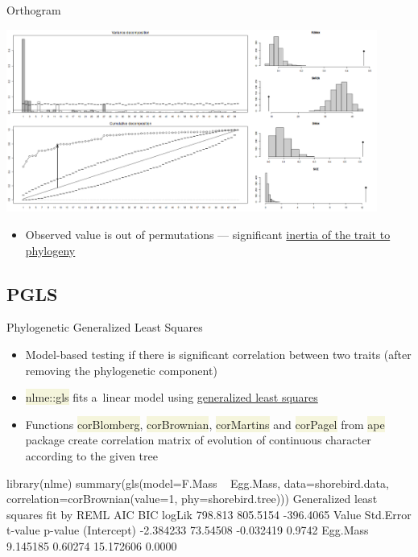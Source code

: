 \documentclass[compress, ucs, xelatex, 11pt, xcolor=svgnames, aspectratio=169,
	hyperref={
		bookmarks=true,
		unicode=true,
		colorlinks=true,
		pdftitle={Molecular data in R},
		plainpages=false,
		pdfauthor={Vojtech Zeisek},
		pdfsubject={Course about phylogeny and evolution in R},
		pdfcreator={XeLaTeX},
		pdfkeywords={R, evolution, phylogeny, molecular data},
		linkcolor=Crimson, %
		anchorcolor=Magenta, %
		citecolor=Magenta, %
		filecolor=Magenta, %
		menucolor=Magenta, %
		urlcolor=DodgerBlue, %
		pdftex},
	url={hyphens, lowtilde} %
	]{beamer}
\renewcommand{\texttt}[1]{\colorbox{Beige}{{\ttfamily #1}}}
\begin{document}
\begin{frame}{Orthogram}
	\begin{center}
		\includegraphics[height=6cm]{orthogram.png}
	\end{center}
	\begin{itemize}
		\item Observed value is out of permutations --- significant \href{https://en.wikipedia.org/wiki/Phylogenetic_inertia}{inertia of the trait to phylogeny}
	\end{itemize}
\end{frame}

\subsection{PGLS}

\begin{frame}[fragile]{Phylogenetic Generalized Least Squares}
	\begin{itemize}
		\item Model-based testing if there is significant correlation between two traits (after removing the phylogenetic component)
		\item \texttt{nlme::gls} fits a~linear model using \href{https://en.wikipedia.org/wiki/Generalized_least_squares}{generalized least squares}
		\item Functions \texttt{corBlomberg}, \texttt{corBrownian}, \texttt{corMartins} and \texttt{corPagel} from \texttt{ape} package create correlation matrix of evolution of continuous character according to the given tree
	\end{itemize}
	\begin{spluscode}
    library(nlme)
    summary(gls(model=F.Mass ~ Egg.Mass, data=shorebird.data,
      correlation=corBrownian(value=1, phy=shorebird.tree)))
      Generalized least squares fit by REML
          AIC      BIC    logLik
      798.813 805.5154 -396.4065
                    Value Std.Error   t-value p-value
    (Intercept) -2.384233  73.54508 -0.032419  0.9742
    Egg.Mass     9.145185   0.60274 15.172606  0.0000
\end{spluscode}
\end{frame}
\end{document}
